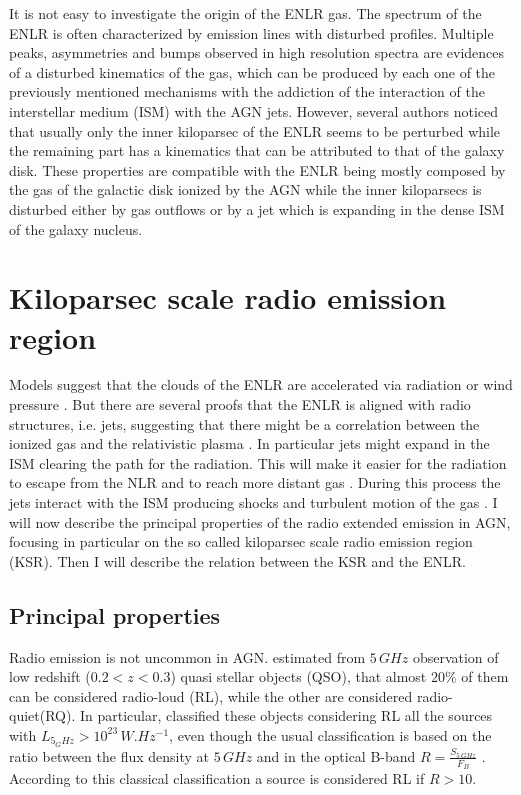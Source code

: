 \documentclass[../main.tex]{subfiles}
\begin{document}
It is not easy to investigate the origin of the ENLR gas.
The spectrum of the ENLR is often characterized by emission lines with disturbed profiles.
Multiple peaks, asymmetries and bumps observed in high resolution spectra \citep{Ozaki09,Morganti07,Congiu17} are evidences of a disturbed kinematics of the gas, which can be produced by each one of the previously mentioned mechanisms with the addiction of the interaction of the interstellar medium (ISM) with the AGN jets.
However, several authors \citep[e.g.][]{Unger87,Fischer17,Fischer18} noticed that usually only the inner kiloparsec of the ENLR seems to be perturbed while the remaining part has a kinematics that can be attributed to that of the galaxy disk.
These properties are compatible with the ENLR being mostly composed by the gas of the galactic disk ionized by the AGN while the inner kiloparsecs is disturbed either by gas outflows or by a jet which is expanding in the dense ISM of the galaxy nucleus.



\section{Kiloparsec scale radio emission region}
\label{sec:ksr}

Models suggest that the clouds of the ENLR are accelerated via radiation or wind pressure \citep{Crenshaw00,Crenshaw00b}.
But there are several proofs that the ENLR is aligned with radio structures, i.e. jets, suggesting that there might be a correlation between the ionized gas and the relativistic plasma \citep[e.g.][]{Unger87,Wilson94,Falcke98,Schmitt03,Schmitt03b,Morganti07,Husemann13}.
In particular jets might expand in the ISM clearing the path for the radiation.
This will make it easier for the radiation to escape from the NLR and to reach more distant gas \citep{Wilson94}.
During this process the jets interact with the ISM producing shocks and turbulent motion of the gas \citep[e.g.][]{Cracco11,Contini13,Congiu17}.
I will now describe the principal properties of the radio extended emission in AGN, focusing in particular on the so called kiloparsec scale radio emission region (KSR).
Then I will describe the relation between the KSR and the ENLR.

\subsection{Principal properties}
\label{sec:princ_prop}

Radio emission is not uncommon in AGN.
\citet{Kellermann16} estimated from $5\,\si{GHz}$ observation of low redshift ($0.2<z<0.3$) quasi stellar objects (QSO), that almost $20\%$ of them can be considered radio-loud (RL), while the other are considered radio-quiet(RQ).
In particular, \citet{Kellermann16} classified these objects considering RL all the sources with $L_{5_GHz}>10^{23}\,\si{W.Hz^{-1}}$, even though the usual classification is based on the ratio between the flux density at $5\,\si{GHz}$ and in the optical B-band $R=\frac{S_{5\,\si{GHz}}}{F_{B}}$ \citep{Kellermann89}.
According to this classical classification a source is considered RL if $R>10$.
\end{document}
